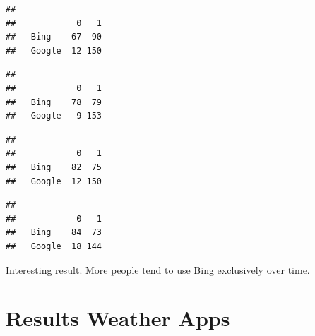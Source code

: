 \documentclass[
  11pt,
]{article}
\newenvironment{Shaded}{\begin{snugshade}}{\end{snugshade}}
\newcommand{\FunctionTok}[1]{\textcolor[rgb]{0.13,0.29,0.53}{\textbf{#1}}}
\newcommand{\NormalTok}[1]{#1}
\newcommand{\SpecialCharTok}[1]{\textcolor[rgb]{0.81,0.36,0.00}{\textbf{#1}}}
\begin{document}
\begin{verbatim}
##         
##            0   1
##   Bing    67  90
##   Google  12 150
\end{verbatim}

\begin{Shaded}
\end{Shaded}

\begin{verbatim}
##         
##            0   1
##   Bing    78  79
##   Google   9 153
\end{verbatim}

\begin{Shaded}
\end{Shaded}

\begin{verbatim}
##         
##            0   1
##   Bing    82  75
##   Google  12 150
\end{verbatim}

\begin{Shaded}
\end{Shaded}

\begin{verbatim}
##         
##            0   1
##   Bing    84  73
##   Google  18 144
\end{verbatim}

Interesting result. More people tend to use Bing exclusively over time.

\hypertarget{results-weather-apps}{%
\section{Results Weather Apps}\label{results-weather-apps}}
\end{document}
